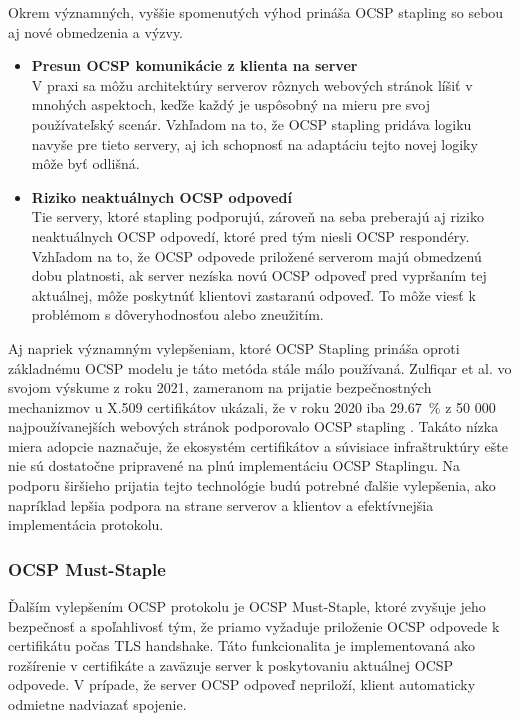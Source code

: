 \documentclass[12pt, twoside]{book}
\begin{document}
Okrem významných, vyššie spomenutých výhod prináša OCSP stapling so sebou aj nové 
obmedzenia a výzvy.

\begin{itemize}
\item \textbf{Presun OCSP komunikácie z klienta na server} \\
V praxi sa môžu architektúry serverov rôznych webových stránok líšiť v mnohých aspektoch, keďže každý je uspôsobný na mieru pre svoj používateľský scenár. 
Vzhľadom na to, že OCSP stapling pridáva logiku navyše pre tieto servery, aj ich 
schopnosť na adaptáciu tejto novej logiky môže byť odlišná.

\item \textbf{Riziko neaktuálnych OCSP odpovedí} \\
Tie servery, ktoré stapling podporujú, zároveň na seba preberajú aj riziko neaktuálnych OCSP odpovedí, ktoré pred tým niesli  OCSP respondéry.
Vzhľadom na to, že OCSP odpovede priložené serverom majú obmedzenú dobu platnosti, ak server nezíska novú OCSP odpoveď pred vypršaním tej aktuálnej, môže poskytnúť klientovi zastaranú odpoveď. To môže viesť k problémom s dôveryhodnosťou alebo zneužitím.\cite{turin}

\end{itemize}

Aj napriek významným vylepšeniam, ktoré OCSP Stapling prináša oproti základnému OCSP modelu je táto metóda stále málo používaná. Zulfiqar et al. vo svojom výskume z roku 2021, zameranom na prijatie bezpečnostných mechanizmov u X.509 certifikátov ukázali, že v roku 2020 iba 29.67~\% z 50 000 najpoužívanejších webových stránok podporovalo OCSP stapling \cite{stapling_adoption}. Takáto nízka miera adopcie naznačuje, že ekosystém certifikátov a súvisiace infraštruktúry ešte nie sú dostatočne pripravené na plnú implementáciu OCSP Staplingu. Na podporu širšieho prijatia tejto technológie budú potrebné ďalšie vylepšenia, ako napríklad lepšia podpora na strane serverov a klientov a efektívnejšia implementácia protokolu.


\subsubsection{OCSP Must-Staple}
Ďalším vylepšením OCSP protokolu je OCSP Must-Staple, ktoré zvyšuje jeho bezpečnosť a spoľahlivosť tým, že priamo vyžaduje priloženie OCSP odpovede k  certifikátu počas TLS handshake. Táto funkcionalita je implementovaná ako rozšírenie v certifikáte a zaväzuje server k poskytovaniu aktuálnej OCSP odpovede. V prípade, že server OCSP odpoveď nepriloží, klient automaticky odmietne nadviazať spojenie.\cite{turin, turin2}
\end{document}
